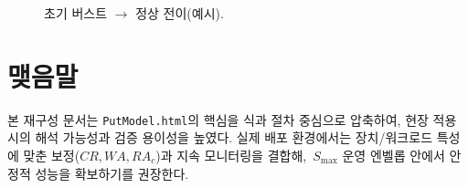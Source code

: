 \documentclass[11pt,a4paper]{article}
\begin{document}
\begin{figure}[h]
    \centering
    \caption{초기 버스트 $\rightarrow$ 정상 전이(예시).}
\end{figure}

\section*{맺음말}
본 재구성 문서는 \texttt{PutModel.html}의 핵심을 식과 절차 중심으로 압축하여,
현장 적용 시의 해석 가능성과 검증 용이성을 높였다.
실제 배포 환경에서는 장치/워크로드 특성에 맞춘 보정(\(CR,WA,RA_c\))과
지속 모니터링을 결합해, \(\,S_{\max}\) 운영 엔벨롭 안에서 안정적 성능을 확보하기를 권장한다.
\end{document}
